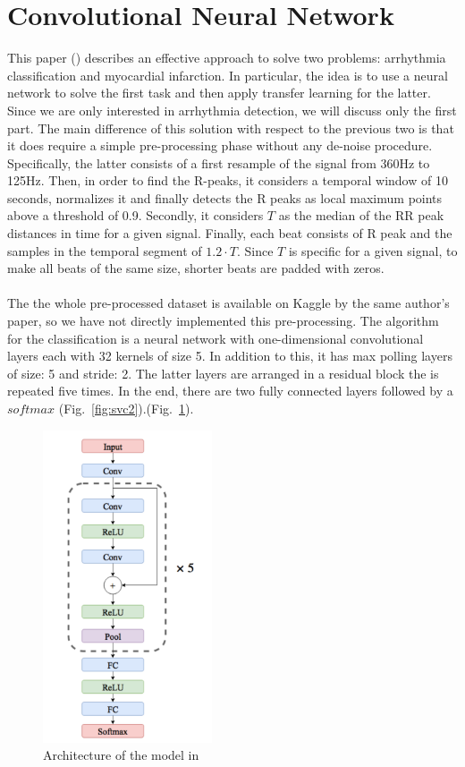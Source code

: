 \documentclass[LaM,binding=0.6cm]{sapthesis}
\begin{document}
\section{Convolutional Neural Network  \cite{cnnfazeli}}
\label{sec:cnnfazelisection}
This paper (\cite{cnnfazeli}) describes an effective approach to solve two problems: arrhythmia classification and myocardial infarction. In particular, the idea is to use a neural network to solve the first task and then apply transfer learning for the latter. Since we are only interested in arrhythmia detection, we will discuss only the first part. The main difference of this solution with respect to the previous two is that it does require a simple pre-processing phase without any de-noise procedure. Specifically, the latter consists of a first resample of the signal from 360Hz to 125Hz. Then, in order to find the R-peaks, it considers a temporal window of 10 seconds, normalizes it and finally detects the R peaks as local maximum points above a threshold of 0.9. Secondly, it considers $T$ as the median of the RR peak distances in time for a given signal. Finally, each beat consists of R peak and the samples in the temporal segment of $1.2 \cdot T$. Since $T$ is specific for a given signal, to make all beats of the same size, shorter beats are padded with zeros.\\\\The the whole pre-processed dataset is available on Kaggle by the same author's paper, so we have not directly implemented this pre-processing. The algorithm for the classification is a neural network with one-dimensional convolutional layers each with 32 kernels of size 5. In addition to this, it has max polling layers of size: 5 and stride: 2. The latter layers are arranged in a residual block the is repeated five times. In the end, there are two fully connected layers followed by a $softmax$ (Fig.~\ref{fig:svc2}).(Fig.~\ref{fig:arch-cnn}).
\begin{figure}  \centering
    \includegraphics[width=50mm,scale=0.7]{arch-cnn}
    \caption{Architecture of the model in \cite{cnnfazeli}}
    \label{fig:arch-cnn}
\end{figure}
\end{document}
